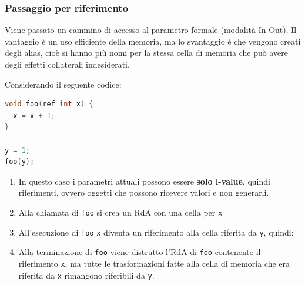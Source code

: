 \documentclass[a4paper]{article}
\begin{document}
\subsubsection{Passaggio per riferimento}
Viene passato un cammino di accesso al parametro formale (modalità In-Out). Il
vantaggio è un uso efficiente della memoria, ma lo svantaggio è che vengono creati
degli alias, cioè si hanno più nomi per la stessa cella di memoria che può avere
degli effetti collaterali indesiderati.

\vspace{1em}
\noindent
Considerando il seguente codice:
\begin{lstlisting}[language=C]
void foo(ref int x) {
  x = x + 1;
}

y = 1;
foo(y);
\end{lstlisting}
\begin{enumerate}
  \item In questo caso i parametri attuali possono essere \textbf{solo l-value},
    quindi riferimenti, ovvero oggetti che possono ricevere valori e non generarli.

  \item Alla chiamata di \texttt{foo} si crea un RdA con una cella per \texttt{x}

  \item All'esecuzione di \texttt{foo} \texttt{x} diventa un riferimento alla cella
    riferita da \texttt{y}, quindi:
    \begin{figure}[H]
      \centering
    \end{figure}

  \item Alla terminazione di \texttt{foo} viene distrutto l'RdA di \texttt{foo}
    contenente il riferimento \texttt{x}, ma tutte le trasformazioni fatte alla
    cella di memoria che era riferita da \texttt{x} rimangono riferibili da \texttt{y}.
\end{enumerate}
\end{document}
